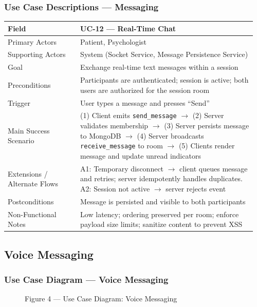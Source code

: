 \documentclass[12pt]{article}
\begin{document}
\subsubsection*{Use Case Descriptions --- Messaging}
\begin{longtable}{L{0.28\linewidth} L{0.68\linewidth}}
\toprule
\textbf{Field} & \textbf{UC-12 --- Real-Time Chat} \\
\midrule
\endhead
Primary Actors & Patient, Psychologist \\
Supporting Actors & System (Socket Service, Message Persistence Service) \\
Goal & Exchange real-time text messages within a session \\
Preconditions & Participants are authenticated; session is active; both users are authorized for the session room \\
Trigger & User types a message and presses ``Send'' \\
Main Success Scenario & (1) Client emits \texttt{send\_message} $\rightarrow$ (2) Server validates membership $\rightarrow$ (3) Server persists message to MongoDB $\rightarrow$ (4) Server broadcasts \texttt{receive\_message} to room $\rightarrow$ (5) Clients render message and update unread indicators \\
Extensions / Alternate Flows & A1: Temporary disconnect $\rightarrow$ client queues message and retries; server idempotently handles duplicates. A2: Session not active $\rightarrow$ server rejects event \\
Postconditions & Message is persisted and visible to both participants \\
Non-Functional Notes & Low latency; ordering preserved per room; enforce payload size limits; sanitize content to prevent XSS \\
\bottomrule
\end{longtable}

\subsection{Voice Messaging}
\subsubsection*{Use Case Diagram --- Voice Messaging}
\begin{figure}[h]
  \centering
  \caption{Figure 4 --- Use Case Diagram: Voice Messaging}
\end{figure}
\end{document}
